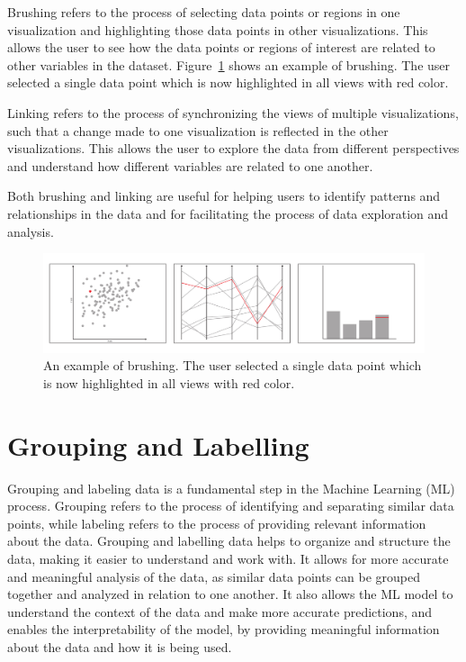 Brushing refers to the process of selecting data points or regions in one
visualization and highlighting those data points in other visualizations.
This allows the user to see how the data points or regions of interest are
related to other variables in the dataset.
Figure~\ref{fig:BrushingDiagram} shows an example of brushing. The user
selected a single data point which is now highlighted in all views with
red color.

Linking refers to the process of synchronizing the views of multiple
visualizations, such that a change made to one visualization is
reflected in the other visualizations. This allows the user to explore
the data from different perspectives and understand how different
variables are related to one another.

Both brushing and linking are useful for helping users to identify
patterns and relationships in the data and for facilitating the
process of data exploration and analysis.

\begin{figure}[tp]
\centering
\includegraphics[frame,keepaspectratio,width=\linewidth,height=\halfh]
{diagrams/brushing.pdf}

\caption[Brushing]
{ An example of brushing. The user selected a single data point which
is now highlighted in all views with red color.
}
\label{fig:BrushingDiagram}
\end{figure}




\section{Grouping and Labelling}

Grouping and labeling data is a fundamental step in the Machine Learning
(ML) process. Grouping refers to the process of identifying and separating
similar data points, while labeling refers to the process of providing
relevant information about the data. Grouping and labelling data helps to
organize and structure the data, making it easier to understand and work
with. It allows for more accurate and meaningful analysis of the data, as
similar data points can be grouped together and analyzed in relation to
one another. It also allows the ML model to understand the context of the
data and make more accurate predictions, and enables the interpretability
of the model, by providing meaningful information about the data and how
it is being used.


